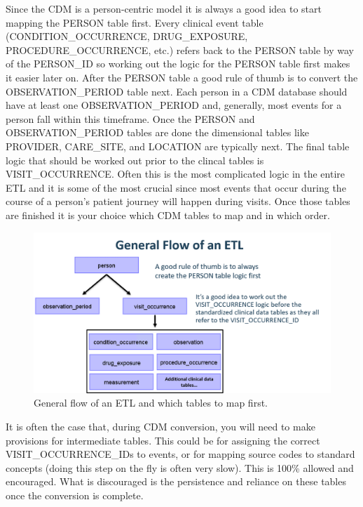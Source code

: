 \documentclass[11pt]{book}
\theoremstyle{definition}
\theoremstyle{definition}
\theoremstyle{definition}
\theoremstyle{remark}
\begin{document}
Since the CDM is a person-centric model it is always a good idea to start mapping the PERSON table first. Every clinical event table (CONDITION\_OCCURRENCE, DRUG\_EXPOSURE, PROCEDURE\_OCCURRENCE, etc.) refers back to the PERSON table by way of the PERSON\_ID so working out the logic for the PERSON table first makes it easier later on. After the PERSON table a good rule of thumb is to convert the OBSERVATION\_PERIOD table next. Each person in a CDM database should have at least one OBSERVATION\_PERIOD and, generally, most events for a person fall within this timeframe. Once the PERSON and OBSERVATION\_PERIOD tables are done the dimensional tables like PROVIDER, CARE\_SITE, and LOCATION are typically next. The final table logic that should be worked out prior to the clincal tables is VISIT\_OCCURRENCE. Often this is the most complicated logic in the entire ETL and it is some of the most crucial since most events that occur during the course of a person's patient journey will happen during visits. Once those tables are finished it is your choice which CDM tables to map and in which order.

\begin{figure}
\includegraphics[width=1\linewidth]{images/ExtractTransformLoad/flowOfEtl} \caption{General flow of an ETL and which tables to map first.}\label{fig:etlFlow}
\end{figure}

It is often the case that, during CDM conversion, you will need to make provisions for intermediate tables. This could be for assigning the correct VISIT\_OCCURRENCE\_IDs to events, or for mapping source codes to standard concepts (doing this step on the fly is often very slow). This is 100\% allowed and encouraged. What is discouraged is the persistence and reliance on these tables once the conversion is complete.
\end{document}
